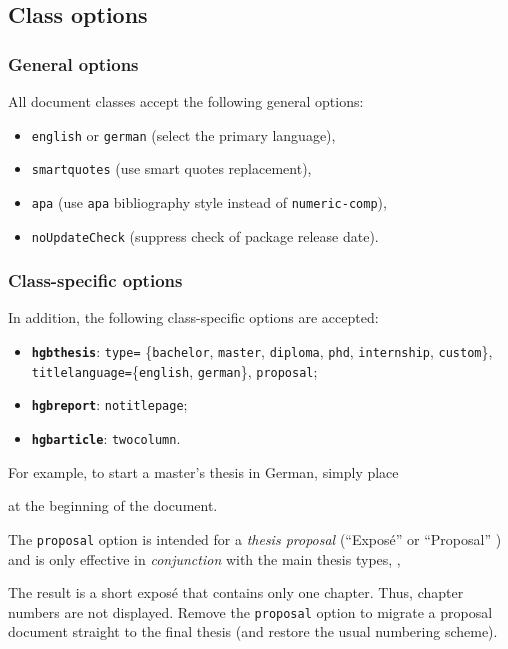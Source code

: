 \documentclass[english]{hgbarticle}
\begin{document}
\subsection{Class options}

\subsubsection{General options}

All document classes accept the following general options:
%
\begin{itemize}
    \item \texttt{english} or \texttt{german} (select the primary language),
    \item \texttt{smartquotes} (use smart quotes replacement),
    \item \texttt{apa} (use \texttt{apa} bibliography style instead of
    \texttt{numeric-comp}),
    \item \texttt{noUpdateCheck} (suppress check of package release date).
\end{itemize}


\subsubsection{Class-specific options}

In addition, the following class-specific options are accepted:
%
\begin{itemize}
    \item \textbf{\texttt{hgbthesis}}:
    \texttt{type=}%
    \{\texttt{bachelor}, \texttt{master}, \texttt{diploma}, \texttt{phd}, \texttt{internship}, \texttt{custom}\},\newline
    \texttt{titlelanguage=}\{\texttt{english}, \texttt{german}\},
    \texttt{proposal};
    \item \textbf{\texttt{hgbreport}}: \texttt{notitlepage};
    \item \textbf{\texttt{hgbarticle}}: \texttt{twocolumn}.
\end{itemize}
%
For example, to start a master's thesis in German, simply place
%
%
at the beginning of the document.

The \texttt{proposal} option is intended for a \emph{thesis proposal} (``Exposé'' or ``Proposal'' ) and is 
only effective in \emph{conjunction} with the main thesis types, \eg,
%
%
The result is a short exposé that contains only one chapter. Thus,
chapter numbers are not displayed. Remove the \texttt{proposal} option to
migrate a proposal document straight to the final thesis (and restore the usual
numbering scheme).
\end{document}
